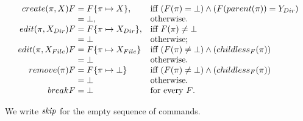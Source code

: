\begin{forrsi}
{\small{
\begin{gather*}\begin{array}{r@{}ll}
create(\pi,X)F&{}=F\{\pi\mapsto X\}, 
&\mbox{iff~}(F(\pi)=\ud)\wedge(F(parent(\pi))=\cdir{Y})\\
&{}=\ud, &\mbox{otherwise.}\\
edit(\pi,\cdir{X})F&{}=F\{\pi\mapsto \cdir{X}\}, 
&\mbox{iff~}F(\pi)\neq\ud\\
&{}=\ud &\mbox{otherwise;}\\
edit(\pi,\cfile{X})F&{}=F\{\pi\mapsto\cfile{X}\} 
&\mbox{iff~}(F(\pi)\neq\ud)\wedge(childless_F(\pi))\\  
&{}=\ud &\mbox{otherwise.}\\
remove(\pi)F&{}=F\{\pi\mapsto\ud\} 
&\mbox{iff~}(F(\pi)\neq\ud)\wedge(childless_F(\pi))\\
&{}=\ud &\mbox{otherwise.}\\
breakF&{}=\ud &\mbox{for every $F$.}
\end{array}\end{gather*}
}}
\end{forrsi}
We write \(\mathit{skip}\) for the empty sequence of commands.

